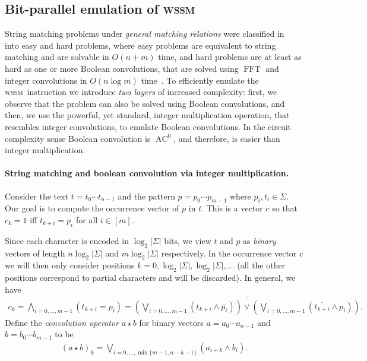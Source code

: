 \documentclass[12pt]{article}
\newcommand{\rem}[1]{{\marginpar{\raggedright\scriptsize #1}}}
\newcommand{\wssm}{\textsc{wssm}}
\begin{document}
\subsection{Bit-parallel emulation of \wssm\ }
\label{sub:details-bit-parallel-emulation}

String matching problems under {\em general matching relations} were
classified in~\cite{mp:94,mr:95} into easy and hard problems, where
easy problems are equivalent to string matching and are solvable in
$O(n+m)$ time, and hard problems are at least as hard as one or more
Boolean convolutions, that are %
solved using $\mathop{FFT}$ and
integer convolutions in $O(n\log m)$ time~\cite{ahu-book:74,fp:74}.  To efficiently
emulate the \wssm\ instruction we introduce {\em two layers} of increased complexity: 
first, we observe that the %
problem can also be solved using Boolean convolutions, and then, we use the
powerful, yet standard, integer multiplication operation, that
resembles integer convolutions, to emulate Boolean convolutions.  
In the circuit complexity sense Boolean convolution is $\mathop{AC}^0$,
and therefore, is easier than integer multiplication.
  


\paragraph{\bf String matching and boolean convolution via
  integer multiplication.} 
%
Consider the text  $t= t_{0}\cdots t_{n-1}$ and the pattern $p= p_{0}\cdots
p_{m-1}$ where  $p_i,t_i \in \Sigma$. Our goal is to compute the occurrence vector of $p$ in $t$. This is  a vector 
$c$
so that $c_k=1$ iff $t_{k+i}
= p_{i}$ for all $i \in [m]$. 

Since each
character is encoded in $\log_2 |\Sigma|$ bits, we 
view $t$ and $p$ as {\em binary}  vectors of length $n \log_2 |\Sigma|$  and $m \log_2 |\Sigma|$ respectively. In the occurrence vector $c$ we will then only  consider positions $k=0,\log_2 |\Sigma|, \log_2 |\Sigma|,\ldots $ (all the other positions correspond to partial characters and will be discarded).
In general, we have
\begin{eqnarray*}
c_k  = \bigwedge_{i=0,\ldots,m-1}\!\!\!\!\!\!\! (t_{k+i} = p_i)= 
\overline{\left(\bigvee_{i=0,\ldots,m-1} \!\!\!\!\!\!\! (t_{k+i} \wedge \overline{p_i})\right)\vee
\left(\bigvee_{i=0,\ldots,m-1}\!\!\!\!\!\!\!  (\overline{t_{k+i}} \wedge p_i )\right)}.
\end{eqnarray*}
Define the {\em convolution operator}
$a \star b $ for  binary
vectors $a=a_{0}\cdots a_{n-1}$ and $b=b_{0}\cdots b_{m-1}$ to be
\begin{eqnarray*}
(a \star b)_k = \!\!\!\!\!\! \bigvee_{i=0,\ldots,\min\{m-1,n-k-1\}}\!\!\!\!\!\!\!\!\! (a_{i+k} \wedge b_{i}).
\end{eqnarray*}
\end{document}

